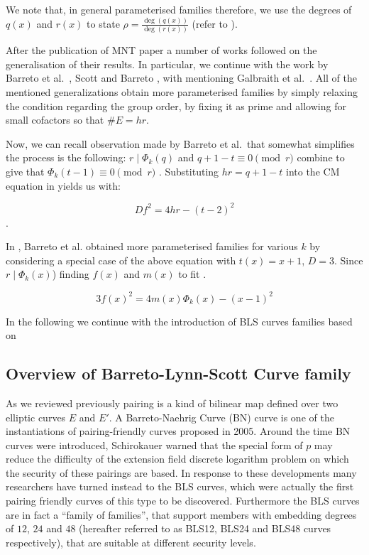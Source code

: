 We note that, in general parameterised families therefore, we use the degrees of $q(x)$ and $r(x)$ to state $\rho = \frac{\deg(q(x))}{\deg(r(x))}$ (refer to ).

After the publication of MNT paper a number of works followed on the generalisation of their results.  In particular, we continue with the work by Barreto et al.\ \cite{howblswascreated}, Scott and Barreto \cite{SB06}, with mentioning Galbraith et al.\ \cite{GMV07}. All of the mentioned generalizations obtain more parameterised families by simply relaxing the condition regarding the group order, by fixing it as prime and allowing for small cofactors so that $\#E = hr$. 

Now, we can recall observation made by Barreto et al.\ that somewhat simplifies the process is the following: $r \mid \Phi_k(q)$ and $q + 1 - t \equiv 0 \pmod{r}$ combine to give that $\Phi_k(t-1) \equiv 0 \pmod{r}$ \cite[Lemma 1]{howblswascreated}. Substituting $hr = q + 1 - t$ into the CM equation in  yields us with:

$$Df^2 = 4hr - (t-2)^2$$.

In \cite{howblswascreated}, Barreto et al. obtained more parameterised families for various $k$ by considering a special case of the above equation with $t(x) = x+1$, $D = 3$. Since $r \mid \Phi_k(x)$) finding $f(x)$ and $m(x)$ to fit .

\begin{equation}
	3f(x)^2 = 4m(x)\Phi_k(x) - (x-1)^2
	\label{eq:cmforbls}
\end{equation}


In the following  we continue with the introduction of BLS curves families based on \cite{ecc.pairing.curves.bls,Costello2012, Scott2019PairingImplementationRevisited, CLN11}
\subsection{Overview of Barreto-Lynn-Scott Curve family}
\label{ssec:choosingbetweenpairingfriendlycurves}


As we reviewed previously pairing is a kind of bilinear map defined over two elliptic curves $E$ and $E'$. A Barreto-Naehrig Curve (BN) curve is one of the instantiations of pairing-friendly curves proposed in 2005. Around the time BN curves were introduced, Schirokauer warned that the special form of $p$ may reduce the difficulty of the extension field
discrete logarithm problem on which the security of these pairings are based.  In response to these developments many researchers have turned instead
to the BLS curves, which were actually the first pairing friendly curves
of this type to be discovered. Furthermore the BLS curves are in
fact a “family of families”, that support members with embedding degrees
of $12$, $24$ and $48$ (hereafter referred to as BLS12, BLS24 and BLS48 curves
respectively), that are suitable at different security levels.

